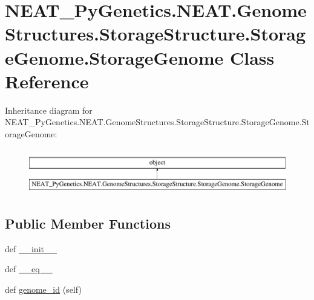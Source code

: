 \hypertarget{classNEAT__PyGenetics_1_1NEAT_1_1GenomeStructures_1_1StorageStructure_1_1StorageGenome_1_1StorageGenome}{}\section{N\+E\+A\+T\+\_\+\+Py\+Genetics.\+N\+E\+A\+T.\+Genome\+Structures.\+Storage\+Structure.\+Storage\+Genome.\+Storage\+Genome Class Reference}
\label{classNEAT__PyGenetics_1_1NEAT_1_1GenomeStructures_1_1StorageStructure_1_1StorageGenome_1_1StorageGenome}
Inheritance diagram for N\+E\+A\+T\+\_\+\+Py\+Genetics.\+N\+E\+A\+T.\+Genome\+Structures.\+Storage\+Structure.\+Storage\+Genome.\+Storage\+Genome\+:\begin{figure}[H]
\begin{center}
\leavevmode
\includegraphics[height=2.000000cm]{classNEAT__PyGenetics_1_1NEAT_1_1GenomeStructures_1_1StorageStructure_1_1StorageGenome_1_1StorageGenome}
\end{center}
\end{figure}
\subsection*{Public Member Functions}
\begin{DoxyCompactItemize}
\item 
def \hyperlink{classNEAT__PyGenetics_1_1NEAT_1_1GenomeStructures_1_1StorageStructure_1_1StorageGenome_1_1StorageGenome_a8b7615cf97ad4ce4c3805ecde57637c8}{\+\_\+\+\_\+init\+\_\+\+\_\+}
\item 
def \hyperlink{classNEAT__PyGenetics_1_1NEAT_1_1GenomeStructures_1_1StorageStructure_1_1StorageGenome_1_1StorageGenome_a0d0ae3acf7162d05cb40fe5eaff9ada9}{\+\_\+\+\_\+eq\+\_\+\+\_\+}
\item 
def \hyperlink{classNEAT__PyGenetics_1_1NEAT_1_1GenomeStructures_1_1StorageStructure_1_1StorageGenome_1_1StorageGenome_a536876e28c6ee27477de23a369e11daa}{genome\+\_\+id} (self)
\end{DoxyCompactItemize}

